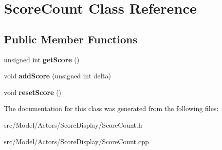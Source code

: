 \hypertarget{classScoreCount}{}\section{Score\+Count Class Reference}
\label{classScoreCount}
\subsection*{Public Member Functions}
\begin{DoxyCompactItemize}
\item 
unsigned int {\bfseries get\+Score} ()\hypertarget{classScoreCount_ace5d4a926f1e81bc8c344108ea0716e0}{}\label{classScoreCount_ace5d4a926f1e81bc8c344108ea0716e0}

\item 
void {\bfseries add\+Score} (unsigned int delta)\hypertarget{classScoreCount_a0f5d068192b63977a274fa6fe3bdba94}{}\label{classScoreCount_a0f5d068192b63977a274fa6fe3bdba94}

\item 
void {\bfseries reset\+Score} ()\hypertarget{classScoreCount_a6c62154905bb4bf9b2e44a06b50ca9a9}{}\label{classScoreCount_a6c62154905bb4bf9b2e44a06b50ca9a9}

\end{DoxyCompactItemize}


The documentation for this class was generated from the following files\+:\begin{DoxyCompactItemize}
\item 
src/\+Model/\+Actors/\+Score\+Display/Score\+Count.\+h\item 
src/\+Model/\+Actors/\+Score\+Display/Score\+Count.\+cpp\end{DoxyCompactItemize}

